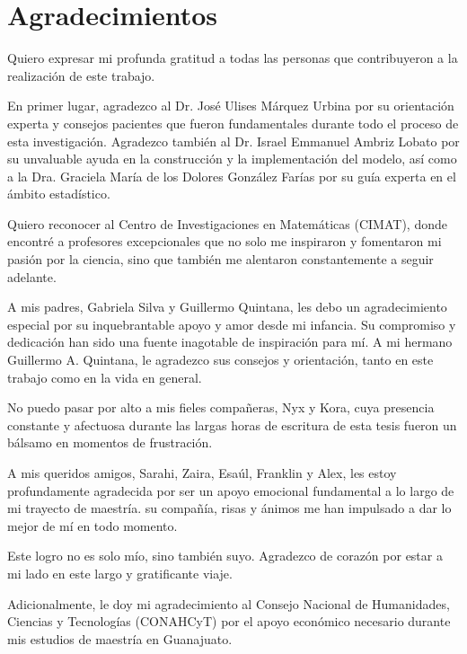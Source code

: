 \chapter*{Agradecimientos}

Quiero expresar mi profunda gratitud a todas las personas que contribuyeron a la realización de este trabajo.

En primer lugar, agradezco al Dr. José Ulises Márquez Urbina por su orientación experta y consejos pacientes que fueron fundamentales durante todo el proceso de esta investigación. Agradezco también al Dr. Israel Emmanuel Ambriz Lobato por su unvaluable ayuda en la construcción y la implementación del modelo, así como a la Dra. Graciela María de los Dolores González Farías por su guía experta en el ámbito estadístico.

Quiero reconocer al Centro de Investigaciones en Matemáticas (CIMAT), donde encontré a profesores excepcionales que no solo me inspiraron y fomentaron mi pasión por la ciencia, sino que también me alentaron constantemente a seguir adelante.

A mis padres, Gabriela Silva y Guillermo Quintana, les debo un agradecimiento especial por su inquebrantable apoyo y amor desde mi infancia. Su compromiso y dedicación han sido una fuente inagotable de inspiración para mí. A mi hermano Guillermo A. Quintana, le agradezco sus consejos y orientación, tanto en este trabajo como en la vida en general.

No puedo pasar por alto a mis fieles compañeras, Nyx y Kora, cuya presencia constante y afectuosa durante las largas horas de escritura de esta tesis fueron un bálsamo en momentos de frustración.

A mis queridos amigos, Sarahi, Zaira, Esaúl, Franklin y Alex, les estoy profundamente agradecida por ser un apoyo emocional fundamental a lo largo de mi trayecto de maestría. su compañía, risas y ánimos me han impulsado a dar lo mejor de mí en todo momento.

Este logro no es solo mío, sino también suyo. Agradezco de corazón por estar a mi lado en este largo y gratificante viaje.

Adicionalmente, le doy mi agradecimiento al Consejo Nacional de Humanidades, Ciencias y Tecnologías (CONAHCyT) por el apoyo económico necesario durante mis estudios de maestría en Guanajuato.
